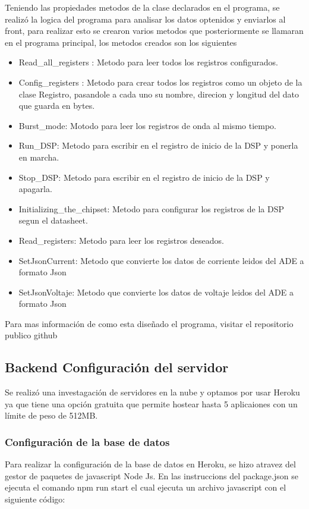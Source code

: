             Teniendo las propiedades  metodos de la clase declarados en el programa, se realizó la logica del programa para analisar los datos optenidos y enviarlos al front, para realizar esto se crearon varios metodos que posteriormente se llamaran en el programa principal, los metodos creados son los siguientes
            \begin{itemize}
                \item Read\_all\_registers : Metodo para leer todos los registros configurados.
                \item Config\_registers : Metodo para crear todos los registros como un objeto de la clase Registro, pasandole a cada uno su nombre, direcion y longitud del dato que guarda en bytes.
                \item Burst\_mode: Motodo para leer los registros de onda al mismo tiempo.
                \item Run\_DSP: Metodo para escribir en el registro de inicio de la DSP y ponerla en marcha.
                \item Stop\_DSP: Metodo para escribir en el registro de inicio de la DSP y apagarla.
                \item Initializing\_the\_chipset: Metodo para configurar los registros de la DSP segun el datasheet.
                \item Read\_registers: Metodo para leer los registros deseados.
                \item SetJsonCurrent: Metodo que convierte los datos de corriente leidos del ADE a formato Json
                \item SetJsonVoltaje: Metodo que convierte los datos de voltaje leidos del ADE a formato Json
            \end{itemize}

            Para mas información de como esta diseñado el programa, visitar el repositorio publico github \cite{A41}
    \subsection{Backend Configuraci\'{o}n del servidor}
        Se realizó una investagación de servidores en la nube y optamos por usar Heroku ya que tiene una opción gratuita que permite hostear hasta 5 aplicaiones con un límite de peso de 512MB. 
        \subsubsection{Configuraci\'on de la base de datos}
            Para realizar la configuración de la base de datos en Heroku, se hizo atravez del gestor de paquetes de javascript Node Js. En las instruccions del package.json se ejecuta el comando npm run start el cual ejecuta un archivo javascript con el siguiente código:

